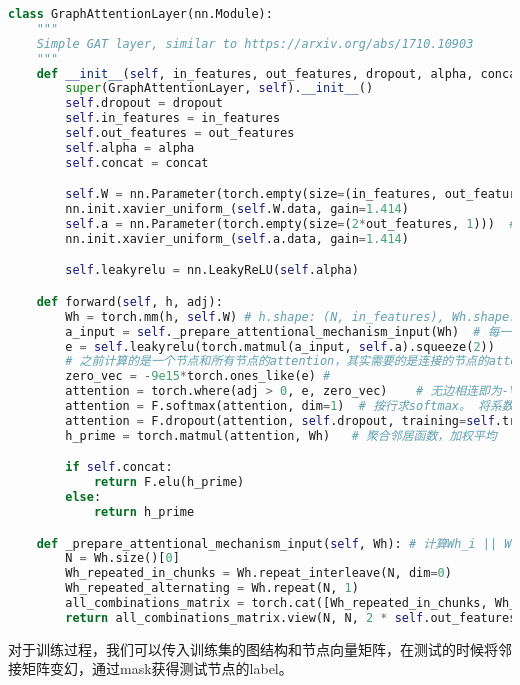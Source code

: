 \documentclass[a4paper]{article}
\begin{document}
\begin{lstlisting}[language=Python, caption=Attention layer]
    class GraphAttentionLayer(nn.Module):
    """
    Simple GAT layer, similar to https://arxiv.org/abs/1710.10903
    """
    def __init__(self, in_features, out_features, dropout, alpha, concat=True):
        super(GraphAttentionLayer, self).__init__()
        self.dropout = dropout
        self.in_features = in_features
        self.out_features = out_features
        self.alpha = alpha
        self.concat = concat

        self.W = nn.Parameter(torch.empty(size=(in_features, out_features)))
        nn.init.xavier_uniform_(self.W.data, gain=1.414)
        self.a = nn.Parameter(torch.empty(size=(2*out_features, 1)))  # concat(V,NeigV)
        nn.init.xavier_uniform_(self.a.data, gain=1.414)

        self.leakyrelu = nn.LeakyReLU(self.alpha)

    def forward(self, h, adj):
        Wh = torch.mm(h, self.W) # h.shape: (N, in_features), Wh.shape: (N, out_features)
        a_input = self._prepare_attentional_mechanism_input(Wh)  # 每一个节点和所有节点，特征。(Vall, Vall, feature)
        e = self.leakyrelu(torch.matmul(a_input, self.a).squeeze(2))
        # 之前计算的是一个节点和所有节点的attention，其实需要的是连接的节点的attention系数
        zero_vec = -9e15*torch.ones_like(e) # 
        attention = torch.where(adj > 0, e, zero_vec)    # 无边相连即为-\inf,有边相连，设置值为\alpha_{i,j}将邻接矩阵中小于0的变成负无穷 e^-\inf = 0
        attention = F.softmax(attention, dim=1)  # 按行求softmax。 将系数归一，sum(axis=1) == 1
        attention = F.dropout(attention, self.dropout, training=self.training)
        h_prime = torch.matmul(attention, Wh)   # 聚合邻居函数，加权平均

        if self.concat:
            return F.elu(h_prime) 
        else:
            return h_prime

    def _prepare_attentional_mechanism_input(self, Wh): # 计算Wh_i || Wh_j 
        N = Wh.size()[0]
        Wh_repeated_in_chunks = Wh.repeat_interleave(N, dim=0)
        Wh_repeated_alternating = Wh.repeat(N, 1)
        all_combinations_matrix = torch.cat([Wh_repeated_in_chunks, Wh_repeated_alternating], dim=1)
        return all_combinations_matrix.view(N, N, 2 * self.out_features)
\end{lstlisting}
对于训练过程，我们可以传入训练集的图结构和节点向量矩阵，在测试的时候将邻接矩阵变幻，通过mask获得测试节点的label。
\end{document}
